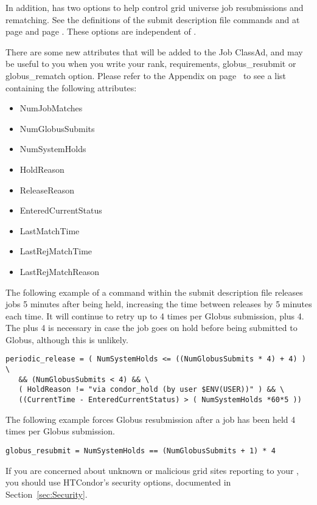 In addition,  has two options to help control
grid universe job resubmissions and rematching.  
See the definitions of the submit description file commands
 and  at 
page \pageref{condor-submit-globus-rematch} and
page \pageref{condor-submit-globus-resubmit}.
These options are independent of .

There are some new attributes that will be added to the Job ClassAd,
and may be useful to you when you write your rank, requirements,
globus\_resubmit or globus\_rematch option. Please refer to
the Appendix on page~\pageref{sec:Job-ClassAd-Attributes} 
to see a list containing the following attributes:

\begin{itemize}
\item NumJobMatches
\item NumGlobusSubmits
\item NumSystemHolds
\item HoldReason
\item ReleaseReason
\item EnteredCurrentStatus
\item LastMatchTime
\item LastRejMatchTime
\item LastRejMatchReason
\end{itemize}

The following example of a command within the submit description file
releases jobs 5 minutes after being held,
increasing the time between releases by 5 minutes each time.
It will continue to retry up to 4 times per Globus
submission, plus 4.
The plus 4 is necessary in case
the job goes on hold before being submitted to Globus, although
this is unlikely.

\footnotesize
\begin{verbatim}
periodic_release = ( NumSystemHolds <= ((NumGlobusSubmits * 4) + 4) ) \
   && (NumGlobusSubmits < 4) && \
   ( HoldReason != "via condor_hold (by user $ENV(USER))" ) && \
   ((CurrentTime - EnteredCurrentStatus) > ( NumSystemHolds *60*5 ))
\end{verbatim}
\normalsize

The following example forces Globus resubmission after a job has
been held 4 times per Globus submission.

\footnotesize
\begin{verbatim}
globus_resubmit = NumSystemHolds == (NumGlobusSubmits + 1) * 4
\end{verbatim}
\normalsize

If you are concerned about unknown or malicious grid sites reporting
to your , you should use HTCondor's security options,
documented in Section~\ref{sec:Security}.
